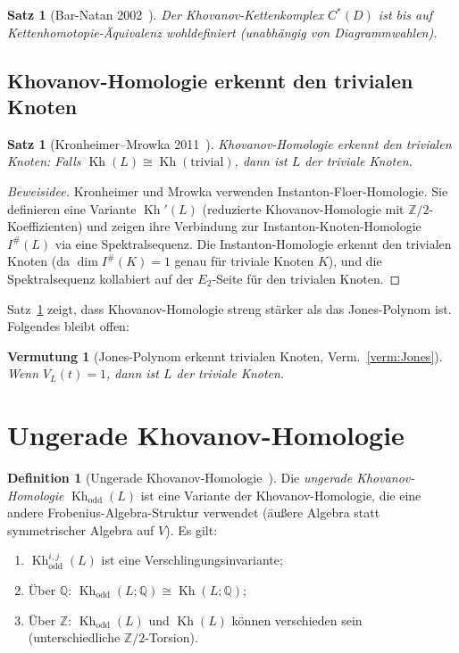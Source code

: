 \documentclass[12pt,a4paper]{amsart}
\newtheorem{satz}[theorem]{Satz}
\newtheorem{vermutung}[theorem]{Vermutung}
\theoremstyle{definition}
\newtheorem{definition_de}[theorem]{Definition}
\theoremstyle{remark}
\newcommand{\Z}{\mathbb{Z}}
\newcommand{\Q}{\mathbb{Q}}
\DeclareMathOperator{\Kh}{Kh}
\begin{document}
\begin{satz}[Bar-Natan 2002~\cite{BarNatan2002}]
Der Khovanov-Kettenkomplex $C^*(D)$ ist bis auf Kettenhomotopie-Äquivalenz
wohldefiniert (unabhängig von Diagrammwahlen).
\end{satz}

\subsection{Khovanov-Homologie erkennt den trivialen Knoten}

\begin{satz}[Kronheimer--Mrowka 2011~\cite{KronheimerMrowka2011}]
\label{satz:KM}
Khovanov-Homologie erkennt den trivialen Knoten: Falls
$\Kh(L) \cong \Kh(\text{trivial})$, dann ist $L$ der triviale Knoten.
\end{satz}

\begin{proof}[Beweisidee]
Kronheimer und Mrowka verwenden Instanton-Floer-Homologie. Sie definieren
eine Variante $\Kh'(L)$ (reduzierte Khovanov-Homologie mit $\Z/2$-Koeffizienten)
und zeigen ihre Verbindung zur Instanton-Knoten-Homologie $I^\#(L)$ via
eine Spektralsequenz. Die Instanton-Homologie erkennt den trivialen Knoten
(da $\dim I^\#(K) = 1$ genau für triviale Knoten $K$), und die
Spektralsequenz kollabiert auf der $E_2$-Seite für den trivialen Knoten.
\end{proof}

Satz~\ref{satz:KM} zeigt, dass Khovanov-Homologie streng stärker als das
Jones-Polynom ist. Folgendes bleibt offen:

\begin{vermutung}[Jones-Polynom erkennt trivialen Knoten, Verm.~\ref{verm:Jones}]
Wenn $V_L(t) = 1$, dann ist $L$ der triviale Knoten.
\end{vermutung}

\section{Ungerade Khovanov-Homologie}

\begin{definition_de}[Ungerade Khovanov-Homologie~\cite{OzsvathRasmussenSzabo2013}]
Die \emph{ungerade Khovanov-Homologie} $\Kh_{\mathrm{odd}}(L)$ ist eine
Variante der Khovanov-Homologie, die eine andere Frobenius-Algebra-Struktur
verwendet (äußere Algebra statt symmetrischer Algebra auf $V$). Es gilt:
\begin{enumerate}[label=\roman*)]
\item $\Kh_{\mathrm{odd}}^{i,j}(L)$ ist eine Verschlingungsinvariante;
\item Über $\Q$: $\Kh_{\mathrm{odd}}(L; \Q) \cong \Kh(L; \Q)$;
\item Über $\Z$: $\Kh_{\mathrm{odd}}(L)$ und $\Kh(L)$ können verschieden
      sein (unterschiedliche $\Z/2$-Torsion).
\end{enumerate}
\end{definition_de}
\end{document}

